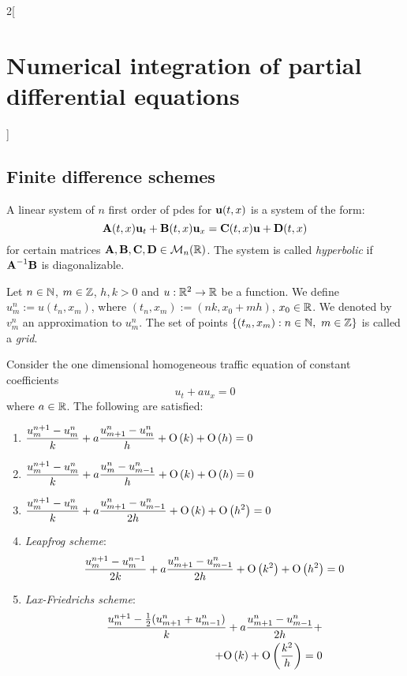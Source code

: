 \documentclass[../../../main_math.tex]{subfiles}
\begin{document}
\begin{multicols}{2}[\section{Numerical integration of partial differential equations}]
  \subsection{Finite difference schemes}
  \begin{definition}
    A linear system of $n$ first order of pdes for $\boldsymbol{\mathrm{u}}(t,x)$ is a system of the form: $$\boldsymbol{\mathrm{A}}(t,x)\boldsymbol{\mathrm{u}}_t+\boldsymbol{\mathrm{B}}(t,x)\boldsymbol{\mathrm{u}}_x=\boldsymbol{\mathrm{C}}(t,x)\boldsymbol{\mathrm{u}}+\boldsymbol{\mathrm{D}}(t,x)$$
    for certain matrices $\boldsymbol{\mathrm{A}},\boldsymbol{\mathrm{B}},\boldsymbol{\mathrm{C}}, \boldsymbol{\mathrm{D}}\in \mathcal{M}_n(\mathbb{R})$. The system is called \emph{hyperbolic} if $\boldsymbol{\mathrm{A}}^{-1}\boldsymbol{\mathrm{B}}$ is diagonalizable.
  \end{definition}
  \begin{definition}
    Let $n\in\mathbb{N}$, $m\in\mathbb{Z}$, $h,k>0$ and $u:\mathbb{R}^2\rightarrow\mathbb{R}$ be a function. We define $u_m^n:=u(t_n,x_m)$, where $(t_n, x_m):=(nk,x_0+mh)$, $x_0\in\mathbb{R}$. We denoted by $v_m^n$ an approximation to $u_m^n$. The set of points $\{(t_n,x_m):n\in\NN,\ m\in\ZZ\}$ is called a \emph{grid}.
  \end{definition}
  \begin{proposition}
    Consider the one dimensional homogeneous traffic equation of constant coefficients
    \begin{equation}\label{NIPDE:traffic}
      u_t+au_x=0
    \end{equation}
    where $a\in\mathbb{R}$.
    The following are satisfied:
    \begin{enumerate}
      \item $\displaystyle\frac{u_m^{n+1}-u_m^n}{k}+a\frac{u_{m+1}^n-u_m^n}{h}+\mathrm{O}\left(k\right)+\mathrm{O}\left(h\right)=0$
      \item $\displaystyle\frac{u_m^{n+1}-u_m^n}{k}+a\frac{u_{m}^n-u_{m-1}^n}{h}+\mathrm{O}\left(k\right)+\mathrm{O}\left(h\right)=0$
      \item $\displaystyle\frac{u_m^{n+1}-u_m^n}{k}+a\frac{u_{m+1}^n-u_{m-1}^n}{2h}+\mathrm{O}\left(k\right)+\mathrm{O}\left(h^2\right)=0$
      \item \emph{Leapfrog scheme}: $$\frac{u_m^{n+1}-u_m^{n-1}}{2k}+a\frac{u_{m+1}^n-u_{m-1}^n}{2h}+\mathrm{O}\left(k^2\right)+\mathrm{O}\left(h^2\right)=0$$
      \item \emph{Lax-Friedrichs scheme}:
            \begin{equation}
              \begin{split}
                \frac{u_m^{n+1}-\frac{1}{2}(u_{m+1}^n+u_{m-1}^n)}{k}+a\frac{u_{m+1}^n-u_{m-1}^n}{2h} + \\ + \O{k}+\O{\frac{k^2}{h}}=0

\end{split}
\end{equation}
\end{enumerate}
\end{proposition}
\end{multicols}
\end{document}
